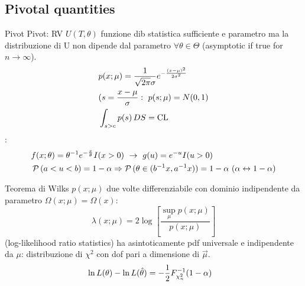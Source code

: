 \subsection{Pivotal quantities}

\begin{frame}{Pivot}
Pivot: RV $U(T,\theta)$ funzione dib statistica sufficiente e parametro ma la distribuzione di U non dipende dal parametro $\forall \theta\in\Theta$ (asymptotic if true for $n\to\infty$).
\begin{align*}
&p(x;\mu)=\frac{1}{\sqrt{2\pi}\sigma}e^{-\frac{(x-\mu)^2}{2\sigma^2}}\\
&(s=\frac{x-\mu}{\sigma}:\ p(s;\mu)=N(0,1)\\
&\int_{s>c}p(s)\,DS=\operatorname{CL}{}
\end{align*}
:
\begin{align*}
&f(x;\theta)=\invers{\theta}\exp{-\frac{x}{\theta}}I(x>0)\ \to\ g(u)=\exp{-u}I(u>0)\\
&\prob{(a<u<b)}=1-\alpha\Rightarrow\prob{(\theta\in(\invers{b}x,\invers{a}x))}=1-\alpha\ (\alpha\leftrightarrow1-\alpha)
%
\end{align*}
\end{frame}

\begin{frame}{Teorema di Wilks}
$p(x;\mu)$ due volte differenziabile con dominio indipendente da parametro $\Omega(x;\mu)=\Omega(x)$: \[\lambda(x;\mu)=2\log{[\frac{\sup_{\mu}{p(x;\mu)}}{p(x;\mu)}]}\] (log-likelihood ratio statistics) ha asintoticamente pdf universale e indipendente da $\mu$: distribuzione di $\chi^2$ con dof pari a dimensione di $\vec{\mu}$.
\begin{align*}
&\ln{L(\theta)}-\ln{L(\hat{\theta})}=-\frac{1}{2}{F}^{-1}_{\chi_n^2}(1-\alpha)
\end{align*}
\end{frame}

